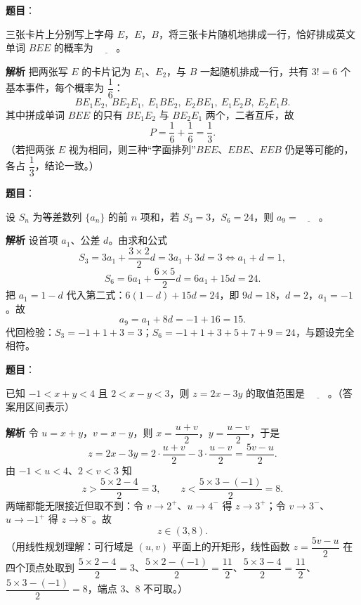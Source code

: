 \begin{answer}

\textbf{题目}：

三张卡片上分别写上字母 $E$，$E$，$B$，将三张卡片随机地排成一行，恰好排成英文单词 $BEE$ 的概率为 $\underline{\qquad}$。

\textbf{解析}
把两张写 $E$ 的卡片记为 $E_1$、$E_2$，与 $B$ 一起随机排成一行，共有 $3!=6$ 个基本事件，每个概率为 $\dfrac16$：
\nopagebreak[4]
\[BE_1E_2,\ BE_2E_1,\ E_1BE_2,\ E_2BE_1,\ E_1E_2B,\ E_2E_1B.\]
其中拼成单词 $BEE$ 的只有 $BE_1E_2$ 与 $BE_2E_1$ 两个，二者互斥，故
\nopagebreak[4]
\[P=\frac16+\frac16=\frac13.\]
（若把两张 $E$ 视为相同，则三种“字面排列”$BEE$、$EBE$、$EEB$ 仍是等可能的，各占 $\dfrac13$，结论一致。）


\end{answer}
\begin{answer}

\textbf{题目}：

设 $S_n$ 为等差数列 $\{a_n\}$ 的前 $n$ 项和，若 $S_3=3$，$S_6=24$，则 $a_9=\underline{\qquad}$。

\textbf{解析}
设首项 $a_1$、公差 $d$。由求和公式
\nopagebreak[4]
\[S_3=3a_1+\frac{3\times2}{2}d=3a_1+3d=3\iff a_1+d=1,\]
\nopagebreak[4]
\[S_6=6a_1+\frac{6\times5}{2}d=6a_1+15d=24.\]
把 $a_1=1-d$ 代入第二式：$6(1-d)+15d=24$，即 $9d=18$，$d=2$，$a_1=-1$。故
\nopagebreak[4]
\[a_9=a_1+8d=-1+16=15.\]
代回检验：$S_3=-1+1+3=3$；$S_6=-1+1+3+5+7+9=24$，与题设完全相符。


\end{answer}
\begin{answer}

\textbf{题目}：

已知 $-1<x+y<4$ 且 $2<x-y<3$，则 $z=2x-3y$ 的取值范围是 $\underline{\qquad}$。（答案用区间表示）

\textbf{解析}
令 $u=x+y$，$v=x-y$，则 $x=\dfrac{u+v}{2}$，$y=\dfrac{u-v}{2}$，于是
\nopagebreak[4]
\[z=2x-3y=2\cdot\frac{u+v}{2}-3\cdot\frac{u-v}{2}=\frac{5v-u}{2}.\]
由 $-1<u<4$、$2<v<3$ 知
\nopagebreak[4]
\[z>\frac{5\times2-4}{2}=3,\qquad z<\frac{5\times3-(-1)}{2}=8.\]
两端都能无限接近但取不到：令 $v\to2^+$、$u\to4^-$ 得 $z\to3^+$；令 $v\to3^-$、$u\to-1^+$ 得 $z\to8^-$。故
\nopagebreak[4]
\[z\in(3,8).\]
（用线性规划理解：可行域是 $(u,v)$ 平面上的开矩形，线性函数 $z=\dfrac{5v-u}{2}$ 在四个顶点处取到 $\dfrac{5\times2-4}{2}=3$、$\dfrac{5\times2-(-1)}{2}=\dfrac{11}{2}$、$\dfrac{5\times3-4}{2}=\dfrac{11}{2}$、$\dfrac{5\times3-(-1)}{2}=8$，端点 3、8 不可取。）


\end{answer}

